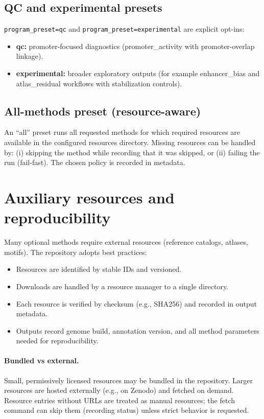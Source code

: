 \documentclass[11pt]{article}
\begin{document}
\subsection{QC and experimental presets}
\texttt{program\_preset=qc} and \texttt{program\_preset=experimental} are explicit opt-ins:
\begin{itemize}[leftmargin=2em]
\item \textbf{qc:} promoter-focused diagnostics (promoter\_activity with promoter-overlap linkage).
\item \textbf{experimental:} broader exploratory outputs (for example enhancer\_bias and atlas\_residual workflows with stabilization controls).
\end{itemize}

\subsection{All-methods preset (resource-aware)}
An ``all'' preset runs all requested methods for which required resources are available in the configured resources directory. Missing resources can be handled by:
(i) skipping the method while recording that it was skipped, or
(ii) failing the run (fail-fast). The chosen policy is recorded in metadata.

\section{Auxiliary resources and reproducibility}
\label{sec:resources}
Many optional methods require external resources (reference catalogs, atlases, motifs). The repository adopts best practices:
\begin{itemize}[leftmargin=2em]
\item Resources are identified by stable IDs and versioned.
\item Downloads are handled by a resource manager to a single directory.
\item Each resource is verified by checksum (e.g., SHA256) and recorded in output metadata.
\item Outputs record genome build, annotation version, and all method parameters needed for reproducibility.
\end{itemize}

\paragraph{Bundled vs external.}
Small, permissively licensed resources may be bundled in the repository. Larger resources are hosted externally (e.g., on Zenodo) and fetched on demand.
Resource entries without URLs are treated as manual resources; the fetch command can skip them (recording status) unless strict behavior is requested.
\end{document}
